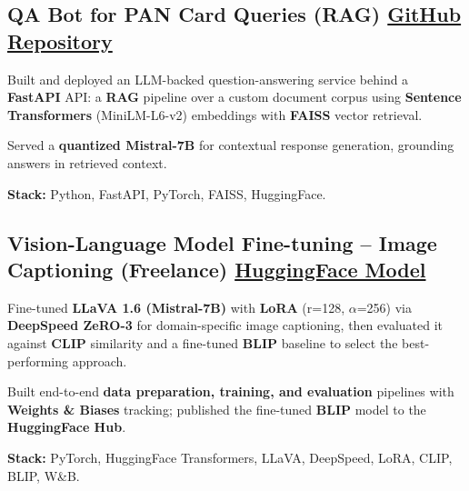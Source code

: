 \documentclass[letter,10pt]{article}
\begin{document}
\subsection{QA Bot for PAN Card Queries (RAG) \hfill \href{https://github.com/sunil448832/Natural-Language-Processing/tree/master/RAG(Retrieval\%20Augment\%20Generation)}{GitHub Repository}}
\begin{zitemize}
\item Built and deployed an LLM-backed question-answering service behind a \textbf{FastAPI} API: a \textbf{RAG} pipeline over a custom document corpus using \textbf{Sentence Transformers} (MiniLM-L6-v2) embeddings with \textbf{FAISS} vector retrieval.
\item Served a \textbf{quantized Mistral-7B} for contextual response generation, grounding answers in retrieved context.
\item \textbf{Stack:} Python, FastAPI, PyTorch, FAISS, HuggingFace.
\end{zitemize}

\subsection{Vision-Language Model Fine-tuning – Image Captioning (Freelance) \hfill \href{https://huggingface.co/sunil448832/blip-model}{HuggingFace Model}}
\begin{zitemize}
\item Fine-tuned \textbf{LLaVA 1.6 (Mistral-7B)} with \textbf{LoRA} (r=128, $\alpha$=256) via \textbf{DeepSpeed ZeRO-3} for domain-specific image captioning, then evaluated it against \textbf{CLIP} similarity and a fine-tuned \textbf{BLIP} baseline to select the best-performing approach.
\item Built end-to-end \textbf{data preparation, training, and evaluation} pipelines with \textbf{Weights \& Biases} tracking; published the fine-tuned \textbf{BLIP} model to the \textbf{HuggingFace Hub}.
\item \textbf{Stack:} PyTorch, HuggingFace Transformers, LLaVA, DeepSpeed, LoRA, CLIP, BLIP, W\&B.
\end{zitemize}
\end{document}

